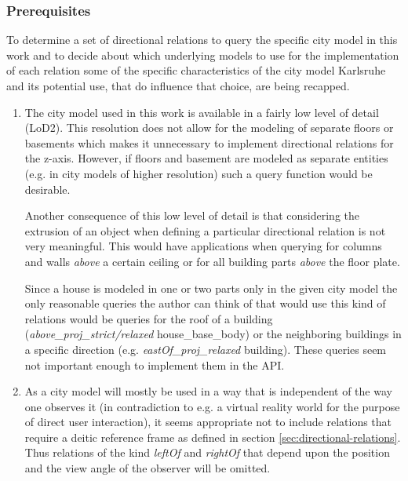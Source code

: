 \documentclass[paper=a4, fontsize=11pt]{scrartcl} %
\numberwithin{equation}{section} %
\numberwithin{figure}{section} %
\numberwithin{table}{section} %
\begin{document}
\subsubsection{Prerequisites}\label{sec:prerequisites}

To determine a set of directional relations to query the specific city model in this work and to decide about which underlying models to use for the implementation of each relation some of the specific characteristics of the city model Karlsruhe and its potential use, that do influence that choice, are being recapped.  

\begin{enumerate}
\item The city model used in this work is available in a fairly low level of detail (LoD2). This resolution does not allow for the modeling of separate floors or basements which makes it unnecessary to implement directional relations for the z-axis. However, if floors and basement are modeled as separate entities (e.g. in city models of higher resolution) such a query function would be desirable.

  Another consequence of this low level of detail is that considering the extrusion of an object when defining a particular directional relation is not very meaningful. This would have applications when querying for columns and walls \emph{above} a certain ceiling or for all building parts \emph{above} the floor plate. 

  Since a house is modeled in one or two parts only in the given city model the only reasonable queries the author can think of that would use this kind of relations would be queries for the roof of a building (\textit{above\_proj\_strict/relaxed} house\_base\_body) or the neighboring buildings in a specific direction (e.g. \textit{eastOf\_proj\_relaxed} building). These queries seem not important enough to implement them in the API.

\item  As a city model will mostly be used in a way that is independent of the way one observes it (in contradiction to e.g. a virtual reality world for the purpose  of direct user interaction), it seems appropriate not to include relations that require a deitic reference frame as defined in section \ref{sec:directional-relations}. Thus relations of the kind \emph{leftOf} and \emph{rightOf} that depend upon the position and the view angle of the observer will be omitted.
\end{enumerate}
\end{document}
